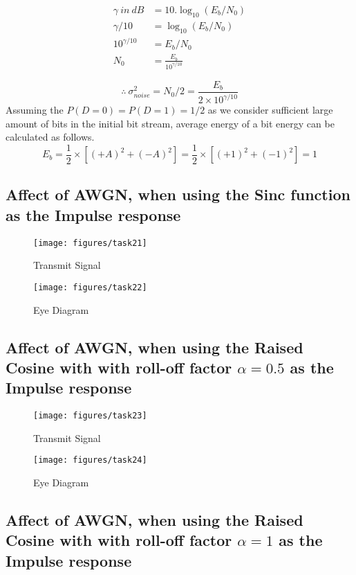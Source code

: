 \documentclass[a4paper,11pt]{article}%
\begin{document}
\[
\begin{split}
	\gamma~in~dB &= 10.\log_{10}(E_b/N_0)\\
	\gamma/10 &= \log_{10}(E_b/N_0)\\
	10^{\gamma/10} &= E_b/N_0\\
	N_0 &= \frac{E_b}{10^{\gamma/10}}
\end{split}
\]

\[\therefore ~\sigma_{noise}^2 = N_0/2 = \frac{E_b}{2 \times 10^{\gamma/10}}  \]
Assuming the $P(D = 0) = P(D = 1) = 1/2$ as we consider sufficient large amount of bits in the initial bit stream, average energy of a bit energy can be calculated as follows.
\[
E_b = \frac{1}{2} \times \left[ (+A)^2 + (-A)^2 \right]
 = \frac{1}{2} \times \left[ (+1)^2 + (-1)^2 \right]
 = 1
\]

\pagebreak
\subsection{Affect of AWGN, when using the Sinc function as the Impulse response}

\begin{figure}[H]
	\centering
	\texttt{[image: figures/task21]}
	\caption{Transmit Signal}
\end{figure}

\begin{figure}[H]
	\centering
	\texttt{[image: figures/task22]}
	\caption{Eye Diagram}
\end{figure}

\pagebreak
\subsection{Affect of AWGN, when using the Raised Cosine with with roll-off factor $\alpha = 0.5$ as the Impulse response}

\begin{figure}[H]
	\centering
	\texttt{[image: figures/task23]}
	\caption{Transmit Signal}
\end{figure}

\begin{figure}[H]
	\centering
	\texttt{[image: figures/task24]}
	\caption{Eye Diagram}
\end{figure}


\pagebreak
\subsection{Affect of AWGN, when using the Raised Cosine with with roll-off factor $\alpha = 1$ as the Impulse response}
\end{document}
